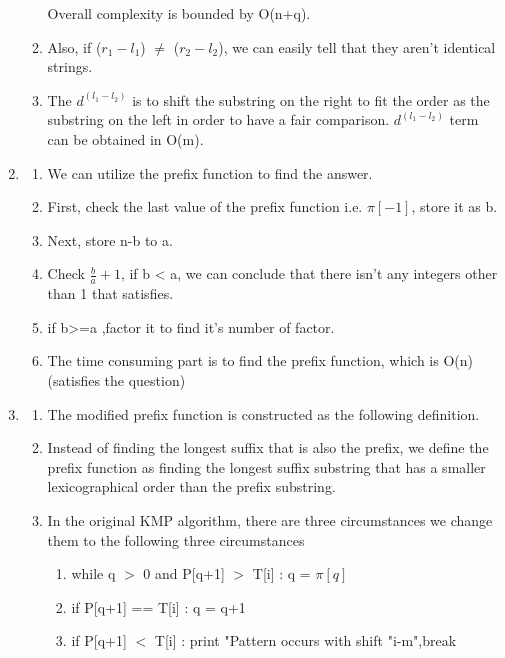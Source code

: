 \documentclass{article}
\begin{document}
\begin{CJK*}{UTF8}{bsmi}
\begin{enumerate}
\begin{enumerate}
        Overall complexity is bounded by O(n+q).
        \item Also, if ($r_1 - l_1$) $\neq$ ($r_2 - l_2$), we can easily tell that they aren't identical strings.
        \item The $d^{(l_1-l_2)}$ is to shift the substring on the right to fit the order as the substring on the left in order to have a fair comparison. $d^{(l_1-l_2)}$ term can be obtained in O(m).
    \end{enumerate}
    \item \begin{enumerate}
        \item We can utilize the prefix function to find the answer.
        \item First, check the last value of the prefix function i.e. $\pi[-1]$, store it as b.
        \item Next, store n-b to a.
        \item Check $\frac{b}{a}+1$, if b < a, we can conclude that there isn't any integers other than 1 that satisfies.
        \item if b>=a ,factor it to find it's number of factor.
        \item The time consuming part is to find the prefix function, which is O(n)(satisfies the question)
    \end{enumerate}    
    \item \begin{enumerate}
        \item The modified prefix function is constructed as the following definition.
        \item Instead of finding the longest suffix that is also the prefix, we define the prefix function as finding the longest suffix substring that has a smaller lexicographical order than the prefix substring.
        \item In the original KMP algorithm, there are three circumstances we change them to the following three circumstances \begin{enumerate}
            \item while q $>$ 0 and P[q+1] $>$ T[i] : q = $\pi[q]$
            \item if P[q+1] == T[i] : q = q+1
            \item if P[q+1] $<$ T[i] : print "Pattern occurs with shift "i-m",break
            

\end{enumerate}
\end{enumerate}
\end{enumerate}
\end{CJK*}
\end{document}
